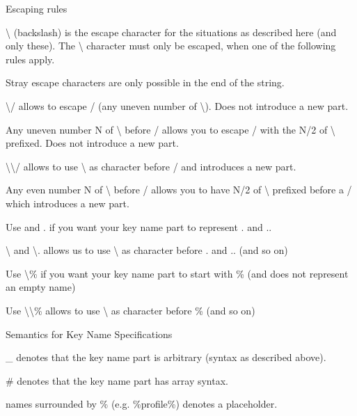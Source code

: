 \begin{DoxyParagraph}{Escaping rules}

\begin{DoxyItemize}
\item \textbackslash{} (backslash) is the escape character for the situations as described here (and only these). The \textbackslash{} character must only be escaped, when one of the following rules apply.
\item Stray escape characters are only possible in the end of the string.
\item \textbackslash{}/ allows to escape / (any uneven number of \textbackslash{}). Does not introduce a new part.
\item Any uneven number N of \textbackslash{} before / allows you to escape / with the N/2 of \textbackslash{} prefixed. Does not introduce a new part.
\item \textbackslash{}\textbackslash{}/ allows to use \textbackslash{} as character before / and introduces a new part.
\item Any even number N of \textbackslash{} before / allows you to have N/2 of \textbackslash{} prefixed before a / which introduces a new part.
\item Use  and . if you want your key name part to represent . and ..
\item \textbackslash{} and \textbackslash{}. allows us to use \textbackslash{} as character before . and .. (and so on)
\item Use \textbackslash{}\% if you want your key name part to start with \% (and does not represent an empty name)
\item Use \textbackslash{}\textbackslash{}\% allows to use \textbackslash{} as character before \% (and so on)
\end{DoxyItemize}
\end{DoxyParagraph}
\begin{DoxyParagraph}{Semantics for Key Name Specifications}

\begin{DoxyItemize}
\item \-\_\- denotes that the key name part is arbitrary (syntax as described above).
\item \# denotes that the key name part has array syntax.
\item names surrounded by \% (e.\-g. \%profile\%) denotes a placeholder.
\end{DoxyItemize}
\end{DoxyParagraph}
